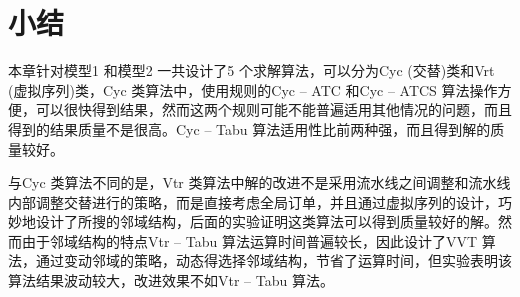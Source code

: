 \section{小结}
本章针对模型1 和模型2 一共设计了5 个求解算法，可以分为Cyc (交替)类和Vrt (虚拟序列)类，Cyc 类算法中，使用规则的Cyc -- ATC 和Cyc -- ATCS 算法操作方便，可以很快得到结果，然而这两个规则可能不能普遍适用其他情况的问题，而且得到的结果质量不是很高。Cyc -- Tabu 算法适用性比前两种强，而且得到解的质量较好。

与Cyc 类算法不同的是，Vtr 类算法中解的改进不是采用流水线之间调整和流水线内部调整交替进行的策略，而是直接考虑全局订单，并且通过虚拟序列的设计，巧妙地设计了所搜的邻域结构，后面的实验证明这类算法可以得到质量较好的解。然而由于邻域结构的特点Vtr -- Tabu 算法运算时间普遍较长，因此设计了VVT 算法，通过变动邻域的策略，动态得选择邻域结构，节省了运算时间，但实验表明该算法结果波动较大，改进效果不如Vtr -- Tabu 算法。